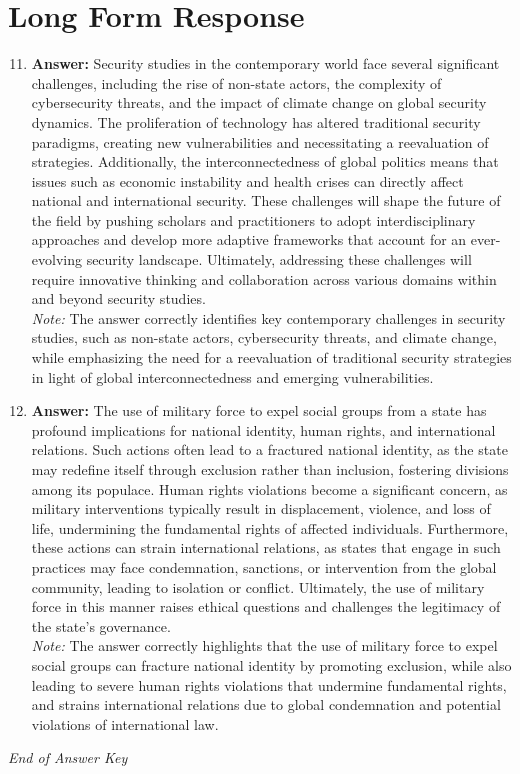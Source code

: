 \documentclass[12pt]{article}
\begin{document}
\section*{Long Form Response}
\begin{enumerate}[label=\arabic*.]
\setcounter{enumi}{10}
\item \textbf{Answer:} Security studies in the contemporary world face several significant challenges, including the rise of non-state actors, the complexity of cybersecurity threats, and the impact of climate change on global security dynamics. The proliferation of technology has altered traditional security paradigms, creating new vulnerabilities and necessitating a reevaluation of strategies. Additionally, the interconnectedness of global politics means that issues such as economic instability and health crises can directly affect national and international security. These challenges will shape the future of the field by pushing scholars and practitioners to adopt interdisciplinary approaches and develop more adaptive frameworks that account for an ever-evolving security landscape. Ultimately, addressing these challenges will require innovative thinking and collaboration across various domains within and beyond security studies.
\\ \textit{Note:} The answer correctly identifies key contemporary challenges in security studies, such as non-state actors, cybersecurity threats, and climate change, while emphasizing the need for a reevaluation of traditional security strategies in light of global interconnectedness and emerging vulnerabilities.
\item \textbf{Answer:} The use of military force to expel social groups from a state has profound implications for national identity, human rights, and international relations. Such actions often lead to a fractured national identity, as the state may redefine itself through exclusion rather than inclusion, fostering divisions among its populace. Human rights violations become a significant concern, as military interventions typically result in displacement, violence, and loss of life, undermining the fundamental rights of affected individuals. Furthermore, these actions can strain international relations, as states that engage in such practices may face condemnation, sanctions, or intervention from the global community, leading to isolation or conflict. Ultimately, the use of military force in this manner raises ethical questions and challenges the legitimacy of the state's governance.
\\ \textit{Note:} The answer correctly highlights that the use of military force to expel social groups can fracture national identity by promoting exclusion, while also leading to severe human rights violations that undermine fundamental rights, and strains international relations due to global condemnation and potential violations of international law.
\end{enumerate}

\vfill
\noindent\textit{End of Answer Key}
\end{document}
